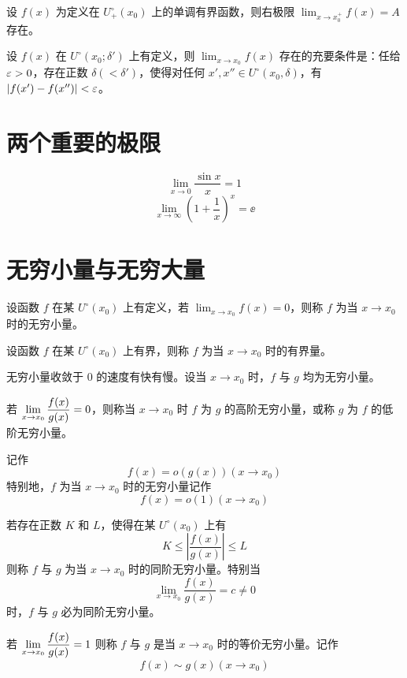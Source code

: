 \begin{theorem}
    设 $f(x)$ 为定义在 $U_+^\circ(x_0)$ 上的单调有界函数，则右极限 $\displaystyle\lim_{x \to x_0^+}f(x)=A$ 存在。
\end{theorem}

\begin{theorem}[Cauchy 准则]
    设 $f(x)$ 在 $U^\circ(x_0;\delta')$ 上有定义，则 $\displaystyle\lim_{x \to x_0}f(x)$ 存在的充要条件是：任给 $\varepsilon > 0$，存在正数 $\delta(<\delta')$，使得对任何 $x',x''\in U^\circ(x_0,\delta)$，有 $|f(x')-f(x'')|<\varepsilon$。
\end{theorem}

\section{两个重要的极限}

$$\lim_{x \to 0}\frac{\sin x}{x} = 1$$
$$\lim_{x \to \infty}\left(1+\frac{1}{x}\right)^x = \ee$$

\section{无穷小量与无穷大量}

\begin{definition}[无穷小量]
    设函数 $f$ 在某 $U^\circ(x_0)$ 上有定义，若 $\displaystyle\lim_{x \to x_0}f(x)=0$，则称 $f$ 为当 $x \to x_0$ 时的无穷小量。
\end{definition}

\begin{definition}[有界量]
    设函数 $f$ 在某 $U^\circ(x_0)$ 上有界，则称 $f$ 为当 $x \to x_0$ 时的有界量。
\end{definition}

无穷小量收敛于 $0$ 的速度有快有慢。设当 $x \to x_0$ 时，$f$ 与 $g$ 均为无穷小量。

若 $\displaystyle\lim_{x \to x_0}\mfrac{f(x)}{g(x)} = 0$，则称当 $x \to x_0$ 时 $f$ 为 $g$ 的高阶无穷小量，或称 $g$ 为 $f$ 的低阶无穷小量。

记作
$$f(x)=o(g(x))(x \to x_0)$$
特别地，$f$ 为当 $x \to x_0$ 时的无穷小量记作
$$f(x)=o(1)(x \to x_0)$$

若存在正数 $K$ 和 $L$，使得在某 $U^\circ(x_0)$ 上有
$$K\leqslant \left|\frac{f(x)}{g(x)}\right| \leqslant L$$
则称 $f$ 与 $g$ 为当 $x \to x_0$ 时的同阶无穷小量。特别当
$$\lim_{x \to x_0}\frac{f(x)}{g(x)} = c \ne 0$$
时，$f$ 与 $g$ 必为同阶无穷小量。

若 $\displaystyle\lim_{x \to x_0}\mfrac{f(x)}{g(x)} = 1$ 则称 $f$ 与 $g$ 是当 $x \to x_0$ 时的等价无穷小量。记作
$$f(x) \sim g(x) (x \to x_0)$$

